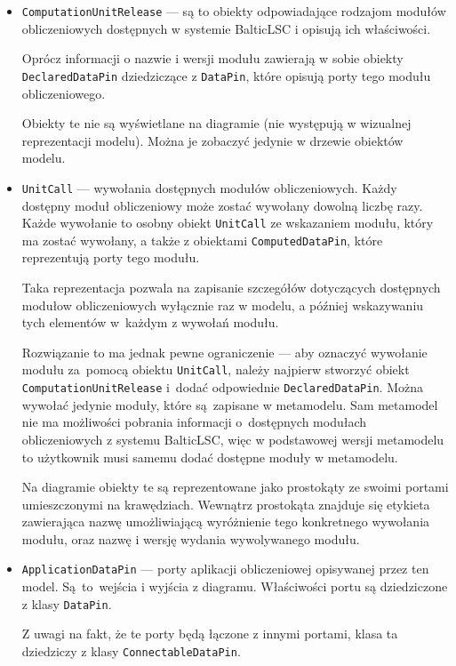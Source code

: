 \begin{itemize}
	\item \texttt{ComputationUnitRelease} --- są to obiekty odpowiadające
	      rodzajom modułów obliczeniowych dostępnych w systemie BalticLSC i opisują ich właściwości.

	      Oprócz informacji o nazwie i wersji modułu zawierają w sobie obiekty \texttt{DeclaredDataPin} dziedziczące z \texttt{DataPin}, które opisują porty tego modułu obliczeniowego.

	      Obiekty te nie są wyświetlane na diagramie (nie występują w wizualnej reprezentacji modelu). Można je zobaczyć jedynie w drzewie obiektów modelu.

	\item \texttt{UnitCall} --- wywołania dostępnych modułów
	      obliczeniowych. Każdy dostępny moduł obliczeniowy może zostać wywołany dowolną liczbę razy. Każde wywołanie to osobny obiekt \texttt{UnitCall} ze wskazaniem modułu, który ma zostać wywołany, a także z obiektami \texttt{ComputedDataPin}, które reprezentują porty tego modułu.

	      Taka reprezentacja pozwala na zapisanie szczegółów dotyczących dostępnych modułow obliczeniowych wyłącznie raz w modelu, a później wskazywaniu tych elementów w~każdym z wywołań modułu.

	      Rozwiązanie to ma jednak pewne ograniczenie --- aby oznaczyć wywołanie modułu za~pomocą obiektu \texttt{UnitCall}, należy najpierw stworzyć obiekt \texttt{ComputationUnitRelease} i~dodać odpowiednie \texttt{DeclaredDataPin}. Można wywołać jedynie moduły, które są~zapisane w metamodelu. Sam metamodel nie ma możliwości pobrania informacji o~dostępnych modułach obliczeniowych z systemu BalticLSC, więc w podstawowej wersji metamodelu to użytkownik musi samemu dodać dostępne moduły w metamodelu.

	      Na diagramie obiekty te są reprezentowane jako prostokąty ze swoimi portami umieszczonymi na krawędziach. Wewnątrz prostokąta znajduje się etykieta zawierająca nazwę umożliwiającą wyróżnienie tego konkretnego wywołania modułu, oraz nazwę i wersję wydania wywolywanego modułu.

	\item \texttt{ApplicationDataPin} --- porty aplikacji obliczeniowej
	      opisywanej przez ten model. Są~to~wejścia i wyjścia z diagramu. Właściwości portu są dziedziczone z klasy \texttt{DataPin}.

	      Z uwagi na fakt, że te porty będą łączone z innymi portami, klasa ta dziedziczy z klasy \texttt{ConnectableDataPin}.


\end{itemize}
